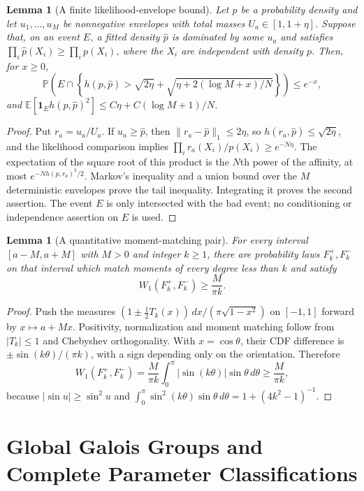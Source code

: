 \documentclass[11pt,a4paper]{article}
\newtheorem{lemma}[theorem]{Lemma}
\theoremstyle{definition}
\theoremstyle{remark}
\numberwithin{equation}{section}
\newcommand{\collectedpart}[1]{%
 \clearpage\part{#1}%
 \setcounter{section}{0}%
 \renewcommand{\thesection}{\Roman{part}.\arabic{section}}%
 \renewcommand{\theHsection}{p\arabic{part}.s\arabic{section}}%
 \renewcommand{\arraystretch}{1}%
}
\begin{document}
\begin{lemma}[A finite likelihood-envelope bound]\label{p5:gg:envelope}
Let $p$ be a probability density and let $u_1,\ldots,u_M$ be
nonnegative envelopes with total masses $U_a\in[1,1+\eta]$.
Suppose that, on an event $E$, a fitted density $\widehat p$ is
dominated by some $u_a$ and satisfies
$\prod_i\widehat p(X_i)\ge\prod_i p(X_i)$, where the $X_i$
are independent with density $p$.  Then, for $x\ge0$,
\[
 \mathbb P\left(E\cap\left\{
 h(p,\widehat p)>\sqrt{2\eta}
       +\sqrt{\eta+2(\log M+x)/N}\right\}\right)\le e^{-x},
\]
and
$\mathbb E[\mathbf1_Eh(p,\widehat p)^2]
 \le C\eta+C(\log M+1)/N$.
\end{lemma}
\begin{proof}
Put $r_a=u_a/U_a$.  If $u_a\ge\widehat p$, then
$\|r_a-\widehat p\|_1\le2\eta$, so
$h(r_a,\widehat p)\le\sqrt{2\eta}$, and the likelihood comparison
implies $\prod_i r_a(X_i)/p(X_i)\ge e^{-N\eta}$.
The expectation of the square root of this product is the $N$th
power of the affinity, at most $e^{-Nh(p,r_a)^2/2}$.
Markov's inequality and a union bound over the $M$ deterministic
envelopes prove the tail inequality.  Integrating it proves the
second assertion.  The event $E$ is only intersected with the bad
event; no conditioning or independence assertion on $E$ is used.
\end{proof}

\begin{lemma}[A quantitative moment-matching pair]\label{p5:gg:witness}
For every interval $[a-M,a+M]$ with $M>0$ and integer $k\ge1$,
there are probability laws $F_k^+,F_k^-$ on that interval which
match moments of every degree less than $k$ and satisfy
\[
                         W_1(F_k^+,F_k^-)\ge\frac M{\pi k}.
\]
\end{lemma}
\begin{proof}
Push the measures
$(1\pm\tfrac12T_k(x))\,dx/(\pi\sqrt{1-x^2})$ on $[-1,1]$
forward by $x\mapsto a+Mx$.  Positivity, normalization and moment
matching follow from $|T_k|\le1$ and Chebyshev orthogonality.
With $x=\cos\theta$, their CDF difference is
$\pm\sin(k\theta)/(\pi k)$, with a sign depending only on the
orientation.  Therefore
\[
 W_1(F_k^+,F_k^-)=\frac M{\pi k}
         \int_0^\pi|\sin(k\theta)|\sin\theta\,d\theta
         \ge\frac M{\pi k},
\]
because $|\sin u|\ge\sin^2u$ and
$\int_0^\pi\sin^2(k\theta)\sin\theta\,d\theta
 =1+(4k^2-1)^{-1}$.
\end{proof}


\collectedpart{Global Galois Groups and Complete Parameter Classifications}\label{part:6}
\end{document}
